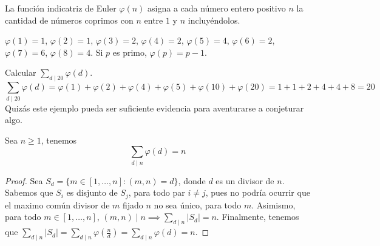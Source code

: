 \documentclass[main.tex]{subfiles}
\begin{document}
\begin{defn}
    La funci\'on indicatriz de Euler $\varphi(n)$ asigna a cada n\'umero entero positivo $n$ la cantidad de n\'umeros coprimos con $n$ entre $1$ y $n$ incluy\'endolos.
\end{defn}

\begin{example}
    $\varphi(1) = 1$, $\varphi(2) = 1$, $\varphi(3) = 2$, $\varphi(4) = 2$, $\varphi(5) = 4$, $\varphi(6) = 2$,
    $\varphi(7) = 6$, $\varphi(8) = 4$. Si $p$ es primo, $\varphi(p) = p - 1$.
\end{example}

\begin{example}
    Calcular $\sum_{d \mid 20} \varphi(d)$.
    $$\sum_{d \mid 20} \varphi(d) = \varphi(1) + \varphi(2) + \varphi(4) + \varphi(5) + \varphi(10) + \varphi(20) = 1 + 1 + 2 + 4 + 4 + 8 = 20$$
    Quiz\'as este ejemplo pueda ser suficiente evidencia para aventurarse a conjeturar algo.
\end{example}

\begin{theorem}
    Sea $n \geq 1$, tenemos
    $$\sum_{d \mid n} \varphi(d) = n$$
\end{theorem}

\begin{proof}
    Sea $S_d = \{m \in [1, \dots, n] : (m, n) = d\}$, donde $d$ es un divisor de $n$. Sabemos que $S_i$ es disjunto de $S_j$, para todo par $i \not= j$, pues no podr\'ia ocurrir que el maximo com\'un divisor de $m$ fijado $n$ no sea \'unico, para todo $m$. Asimismo, para todo $m \in [1, \dots, n]$, $(m, n) \mid n \implies \sum_{d \mid n}|S_d| = n$. Finalmente, tenemos que $\sum_{d \mid n} |S_d| = \sum_{d \mid n} \varphi(\frac{n}{d}) = \sum_{d \mid n} \varphi(d) = n$.
\end{proof}
\end{document}
